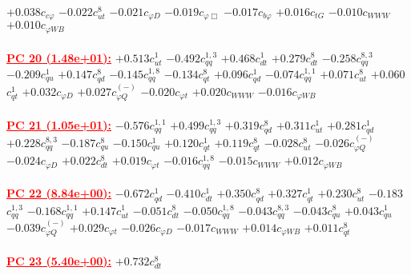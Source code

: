 \documentclass{article}
\begin{document}
{$+0.038$}{\rm $c_{c \varphi}$}
{$-0.022$}{\rm $c_{ut}^{8}$}
{$-0.021$}{\rm $c_{\varphi D}$}
{$-0.019$}{\rm $c_{\varphi \Box}$}
{$-0.017$}{\rm $c_{b \varphi}$}
{$+0.016$}{\rm $c_{tG}$}
{$-0.010$}{\rm $c_{WWW}$}
{$+0.010$}{\rm $c_{\varphi WB}$}
 \nonumber \\ \nonumber \\
\noindent \textcolor{red}{\underline{\bf{PC 20} (1.48e+01):}}
{$+0.513$}{\rm $c_{ut}^{1}$}
{$-0.492$}{\rm $c_{qq}^{1,3}$}
{$+0.468$}{\rm $c_{dt}^{1}$}
{$+0.279$}{\rm $c_{dt}^{8}$}
{$-0.258$}{\rm $c_{qq}^{8,3}$}
{$-0.209$}{\rm $c_{qu}^{1}$}
{$+0.147$}{\rm $c_{qd}^{8}$}
{$-0.145$}{\rm $c_{qq}^{1,8}$}
{$-0.134$}{\rm $c_{qt}^{8}$}
{$+0.096$}{\rm $c_{qd}^{1}$}
{$-0.074$}{\rm $c_{qq}^{1,1}$}
{$+0.071$}{\rm $c_{ut}^{8}$}
{$+0.060$}{\rm $c_{qt}^{1}$}
{$+0.032$}{\rm $c_{\varphi D}$}
{$+0.027$}{\rm $c_{\varphi Q}^{(-)}$}
{$-0.020$}{\rm $c_{\varphi t}$}
{$+0.020$}{\rm $c_{WWW}$}
{$-0.016$}{\rm $c_{\varphi WB}$}
 \nonumber \\ \nonumber \\
\noindent \textcolor{red}{\underline{\bf{PC 21} (1.05e+01):}}
{$-0.576$}{\rm $c_{qq}^{1,1}$}
{$+0.499$}{\rm $c_{qq}^{1,3}$}
{$+0.319$}{\rm $c_{qd}^{8}$}
{$+0.311$}{\rm $c_{ut}^{1}$}
{$+0.281$}{\rm $c_{qd}^{1}$}
{$+0.228$}{\rm $c_{qq}^{8,3}$}
{$-0.187$}{\rm $c_{qu}^{8}$}
{$-0.150$}{\rm $c_{qu}^{1}$}
{$+0.120$}{\rm $c_{qt}^{1}$}
{$+0.119$}{\rm $c_{qt}^{8}$}
{$-0.028$}{\rm $c_{ut}^{8}$}
{$-0.026$}{\rm $c_{\varphi Q}^{(-)}$}
{$-0.024$}{\rm $c_{\varphi D}$}
{$+0.022$}{\rm $c_{dt}^{8}$}
{$+0.019$}{\rm $c_{\varphi t}$}
{$-0.016$}{\rm $c_{qq}^{1,8}$}
{$-0.015$}{\rm $c_{WWW}$}
{$+0.012$}{\rm $c_{\varphi WB}$}
 \nonumber \\ \nonumber \\
\noindent \textcolor{red}{\underline{\bf{PC 22} (8.84e+00):}}
{$-0.672$}{\rm $c_{qd}^{1}$}
{$-0.410$}{\rm $c_{dt}^{1}$}
{$+0.350$}{\rm $c_{qd}^{8}$}
{$+0.327$}{\rm $c_{qt}^{1}$}
{$+0.230$}{\rm $c_{ut}^{8}$}
{$-0.183$}{\rm $c_{qq}^{1,3}$}
{$-0.168$}{\rm $c_{qq}^{1,1}$}
{$+0.147$}{\rm $c_{ut}^{1}$}
{$-0.051$}{\rm $c_{dt}^{8}$}
{$-0.050$}{\rm $c_{qq}^{1,8}$}
{$-0.043$}{\rm $c_{qq}^{8,3}$}
{$-0.043$}{\rm $c_{qu}^{8}$}
{$+0.043$}{\rm $c_{qu}^{1}$}
{$-0.039$}{\rm $c_{\varphi Q}^{(-)}$}
{$+0.029$}{\rm $c_{\varphi t}$}
{$-0.026$}{\rm $c_{\varphi D}$}
{$-0.017$}{\rm $c_{WWW}$}
{$+0.014$}{\rm $c_{\varphi WB}$}
{$+0.011$}{\rm $c_{qt}^{8}$}
 \nonumber \\ \nonumber \\
\noindent \textcolor{red}{\underline{\bf{PC 23} (5.40e+00):}}
{$+0.732$}{\rm $c_{dt}^{8}$}
\end{document}

